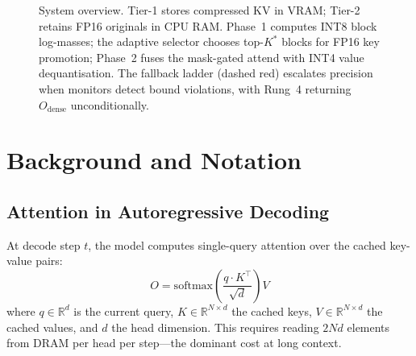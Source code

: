 \documentclass[11pt,a4paper]{article}
\theoremstyle{definition}
\theoremstyle{remark}
\newcommand{\R}{\mathbb{R}}
\begin{document}
\begin{figure}[t]
{
}
\caption{System overview.  Tier-1 stores compressed KV in VRAM; Tier-2 retains FP16 originals in CPU RAM\@.  Phase~1 computes INT8 block log-masses; the adaptive selector chooses top-$K^*$ blocks for FP16 key promotion; Phase~2 fuses the mask-gated attend with INT4 value dequantisation.  The fallback ladder (dashed red) escalates precision when monitors detect bound violations, with Rung~4 returning $O_{\mathrm{dense}}$ unconditionally.}
\label{fig:overview}
\end{figure}

\section{Background and Notation}
\label{sec:background}

\subsection{Attention in Autoregressive Decoding}

At decode step $t$, the model computes single-query attention over the cached key-value pairs:
\begin{equation}
\label{eq:attention}
  O = \mathrm{softmax}\!\left(\frac{q \cdot K^\top}{\sqrt{d}}\right) V
\end{equation}
where $q \in \R^d$ is the current query, $K \in \R^{N \times d}$ the cached keys, $V \in \R^{N \times d}$ the cached values, and $d$ the head dimension.  This requires reading $2Nd$ elements from DRAM per head per step---the dominant cost at long context.
\end{document}
